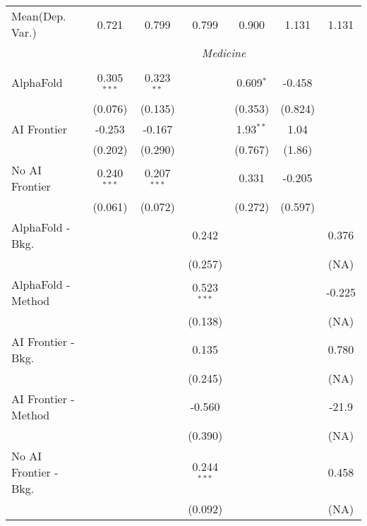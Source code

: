 \begin{tabular}{lcccccc}
Mean(Dep. Var.) & 0.721 & 0.799 & 0.799 & 0.900 & 1.131 & 1.131 \\
 & \multicolumn{6}{c}{\textit{Medicine}} \\ \\
   AlphaFold               & 0.305$^{***}$ & 0.323$^{**}$  &               & 0.609$^{*}$ & -0.458  &   \\   
                           & (0.076)       & (0.135)       &               & (0.353)     & (0.824) &   \\   
   AI Frontier             & -0.253        & -0.167        &               & 1.93$^{**}$ & 1.04    &   \\   
                           & (0.202)       & (0.290)       &               & (0.767)     & (1.86)  &   \\   
   No AI Frontier          & 0.240$^{***}$ & 0.207$^{***}$ &               & 0.331       & -0.205  &   \\   
                           & (0.061)       & (0.072)       &               & (0.272)     & (0.597) &   \\   
   AlphaFold - Bkg.        &               &               & 0.242         &             &         & 0.376\\   
                           &               &               & (0.257)       &             &         & (NA)\\   
   AlphaFold - Method      &               &               & 0.523$^{***}$ &             &         & -0.225\\   
                           &               &               & (0.138)       &             &         & (NA)\\   
   AI Frontier - Bkg.      &               &               & 0.135         &             &         & 0.780\\   
                           &               &               & (0.245)       &             &         & (NA)\\   
   AI Frontier - Method    &               &               & -0.560        &             &         & -21.9\\   
                           &               &               & (0.390)       &             &         & (NA)\\   
   No AI Frontier - Bkg.   &               &               & 0.244$^{***}$ &             &         & 0.458\\   
                           &               &               & (0.092)       &             &         & (NA)\\   

\end{tabular}

